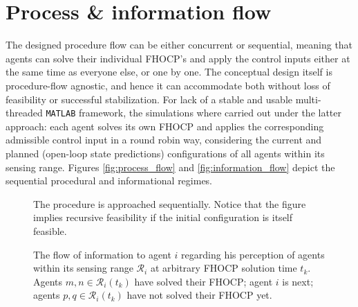 \section{Process \& information flow}

The designed procedure flow can be either concurrent or sequential, meaning
that agents can solve their individual FHOCP's and apply the control inputs
either at the same time as everyone else, or one by one. The conceptual
design itself is procedure-flow agnostic, and hence it can accommodate both
without loss of feasibility or successful stabilization. For lack of a stable
and usable multi-threaded \texttt{MATLAB} framework, the simulations where
carried out under the latter approach: each agent solves its own FHOCP and
applies the corresponding admissible control input in a round robin way,
considering the current and planned (open-loop state predictions) configurations
of all agents within its sensing range. Figures \eqref{fig:process_flow}
and \eqref{fig:information_flow} depict the sequential procedural and
informational regimes.

\begin{figure}[ht]\centering
  \scalebox{0.9}{}
  \caption{The procedure is approached sequentially. Notice that the
    figure implies recursive feasibility if the initial configuration is
    itself feasible.}
  \label{fig:process_flow}
\end{figure}

\begin{figure}[ht]\centering
  \scalebox{0.9}{}
  \caption{The flow of information to agent $i$ regarding his perception of
    agents within its sensing range $\mathcal{R}_i$ at arbitrary FHOCP
    solution time $t_k$. Agents $m,n \in \mathcal{R}_i(t_k)$ have solved their
    FHOCP; agent $i$ is next; agents $p,q \in \mathcal{R}_i(t_k)$ have not
    solved their FHOCP yet.}
  \label{fig:information_flow}
\end{figure}

